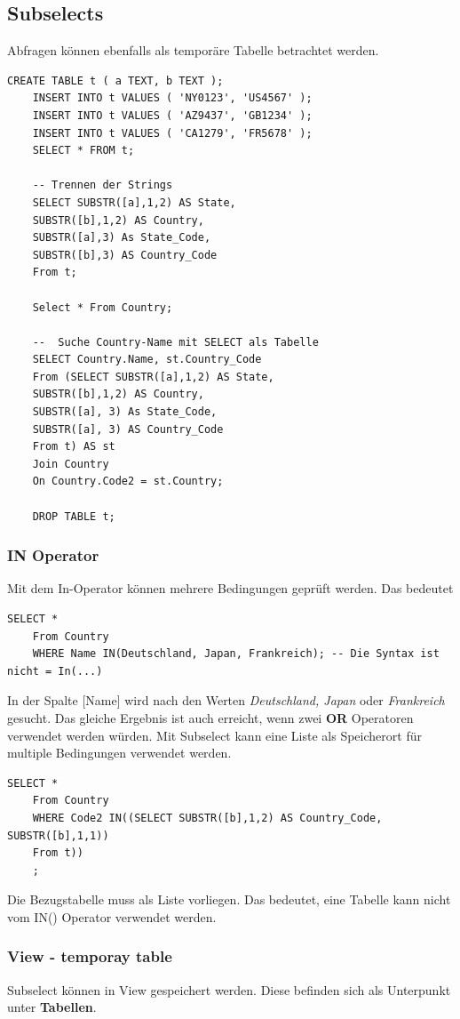 \subsection{Subselects}
Abfragen können ebenfalls als temporäre Tabelle betrachtet werden.
\begin{lstlisting}[style=SQL]
	CREATE TABLE t ( a TEXT, b TEXT );
	INSERT INTO t VALUES ( 'NY0123', 'US4567' );
	INSERT INTO t VALUES ( 'AZ9437', 'GB1234' );
	INSERT INTO t VALUES ( 'CA1279', 'FR5678' );
	SELECT * FROM t;
	
	-- Trennen der Strings
	SELECT SUBSTR([a],1,2) AS State, 
	SUBSTR([b],1,2) AS Country,
	SUBSTR([a],3) As State_Code,
	SUBSTR([b],3) AS Country_Code
	From t;
	
	Select * From Country;
	
	--  Suche Country-Name mit SELECT als Tabelle
	SELECT Country.Name, st.Country_Code
	From (SELECT SUBSTR([a],1,2) AS State, 
	SUBSTR([b],1,2) AS Country,
	SUBSTR([a], 3) As State_Code,
	SUBSTR([a], 3) AS Country_Code
	From t) AS st
	Join Country
	On Country.Code2 = st.Country;
	
	DROP TABLE t;
\end{lstlisting}

\subsubsection{IN Operator}
Mit dem In-Operator können mehrere Bedingungen geprüft werden. Das bedeutet
\begin{lstlisting}[style=SQL]
	SELECT *
	From Country
	WHERE Name IN(Deutschland, Japan, Frankreich); -- Die Syntax ist nicht = In(...)
\end{lstlisting} 

In der Spalte [Name] wird nach den Werten \textit{Deutschland, Japan} oder \textit{Frankreich} gesucht. Das gleiche Ergebnis ist auch erreicht, wenn zwei \textbf{OR} Operatoren verwendet werden würden.
Mit Subselect kann eine Liste als Speicherort für multiple Bedingungen verwendet werden.

\begin{lstlisting}[style=SQL]
	SELECT *
	From Country
	WHERE Code2 IN((SELECT SUBSTR([b],1,2) AS Country_Code, SUBSTR([b],1,1))
	From t))
	;
\end{lstlisting}
Die Bezugstabelle muss als Liste vorliegen. Das bedeutet, eine Tabelle kann nicht vom IN() Operator verwendet werden.

\subsubsection{View - temporay table}
Subselect können in View gespeichert werden. Diese befinden sich als Unterpunkt unter \textbf{Tabellen}. 

